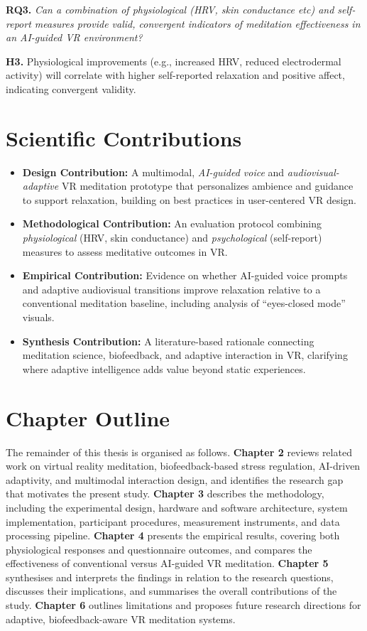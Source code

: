\textbf{RQ3.} \emph{Can a combination of physiological (HRV, skin conductance etc) and self-report measures provide valid, convergent indicators of meditation effectiveness in an AI-guided VR environment?}  

\textbf{H3.} Physiological improvements (e.g., increased HRV, reduced electrodermal activity) will correlate with higher self-reported relaxation and positive affect, indicating convergent validity.


\section{Scientific Contributions}
\begin{itemize}
  \item \textbf{Design Contribution:} A multimodal, \emph{AI-guided voice} and \emph{audiovisual-adaptive} VR meditation prototype that personalizes ambience and guidance to support relaxation, building on best practices in user-centered VR design.
  \item \textbf{Methodological Contribution:} An evaluation protocol combining \emph{physiological} (HRV, skin conductance) and \emph{psychological} (self-report) measures to assess meditative outcomes in VR.
  \item \textbf{Empirical Contribution:} Evidence on whether AI-guided voice prompts and adaptive audiovisual transitions improve relaxation relative to a conventional meditation baseline, including analysis of “eyes-closed mode” visuals.
  \item \textbf{Synthesis Contribution:} A literature-based rationale connecting meditation science, biofeedback, and adaptive interaction in VR, clarifying where adaptive intelligence adds value beyond static experiences.
\end{itemize}

\section{Chapter Outline}
The remainder of this thesis is organised as follows.  
\textbf{Chapter 2} reviews related work on virtual reality meditation, biofeedback-based stress regulation, AI-driven adaptivity, and multimodal interaction design, and identifies the research gap that motivates the present study.  
\textbf{Chapter 3} describes the methodology, including the experimental design, hardware and software architecture, system implementation, participant procedures, measurement instruments, and data processing pipeline.   
\textbf{Chapter 4} presents the empirical results, covering both physiological responses and questionnaire outcomes, and compares the effectiveness of conventional versus AI-guided VR meditation.   
\textbf{Chapter 5} synthesises and interprets the findings in relation to the research questions, discusses their implications, and summarises the overall contributions of the study. 
\textbf{Chapter 6} outlines limitations and proposes future research directions for adaptive, 
biofeedback-aware VR meditation systems.
